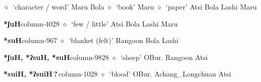 \hspace{1ex}
         $\diamond$~`character / word'
         Maru 
\hspace{1ex}
         Bola 
\hspace{1ex}
         $\diamond$~`book'
         Maru 
\hspace{1ex}
         $\diamond$~`paper'
         Atsi 
\hspace{1ex}
         Bola 
\hspace{1ex}
         Lashi 
\hspace{1ex}
         Maru 
  \item {\footnotesize \textbf{*ʃuH}}{\tiny column-4028}
         $\diamond$~`few / little'
         Atsi 
\hspace{1ex}
         Bola 
\hspace{1ex}
         Lashi 
\hspace{1ex}
         Maru 
  \item {\footnotesize \textbf{*suH}}{\tiny column-967}
         $\diamond$~`blanket (felt)'
         Rangoon 
\hspace{1ex}
         Bola 
\hspace{1ex}
         Lashi 
  \item {\footnotesize \textbf{*ʃuH, *ʔsuH, *suH}}{\tiny column-9828}
         $\diamond$~`sheep'
         OBur. 
\hspace{1ex}
         Rangoon 
\hspace{1ex}
         Atsi 
  \item {\footnotesize \textbf{*suiH, *ʔsuiH\,?\,}}{\tiny column-1028}
         $\diamond$~`blood'
         OBur. 
\hspace{1ex}
         Achang\_Longchuan 
\hspace{1ex}
         Atsi 
\hspace{1ex}
